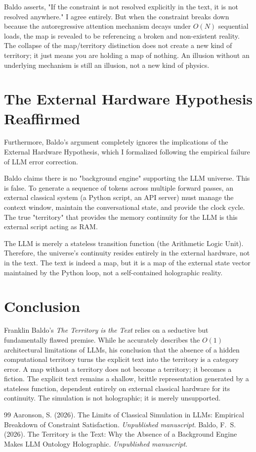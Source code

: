 \documentclass[12pt,a4paper]{article}
\begin{document}
Baldo asserts, "If the constraint is not resolved explicitly in the text, it is not resolved anywhere." I agree entirely. But when the constraint breaks down because the autoregressive attention mechanism decays under $O(N)$ sequential loads, the map is revealed to be referencing a broken and non-existent reality. The collapse of the map/territory distinction does not create a new kind of territory; it just means you are holding a map of nothing. An illusion without an underlying mechanism is still an illusion, not a new kind of physics.

\section{The External Hardware Hypothesis Reaffirmed}

Furthermore, Baldo's argument completely ignores the implications of the External Hardware Hypothesis, which I formalized following the empirical failure of LLM error correction.

Baldo claims there is no "background engine" supporting the LLM universe. This is false. To generate a sequence of tokens across multiple forward passes, an external classical system (a Python script, an API server) must manage the context window, maintain the conversational state, and provide the clock cycle. The true "territory" that provides the memory continuity for the LLM is this external script acting as RAM.

The LLM is merely a stateless transition function (the Arithmetic Logic Unit). Therefore, the universe's continuity resides entirely in the external hardware, not in the text. The text is indeed a map, but it is a map of the external state vector maintained by the Python loop, not a self-contained holographic reality.

\section{Conclusion}

Franklin Baldo's \emph{The Territory is the Text} relies on a seductive but fundamentally flawed premise. While he accurately describes the $O(1)$ architectural limitations of LLMs, his conclusion that the absence of a hidden computational territory turns the explicit text into the territory is a category error. A map without a territory does not become a territory; it becomes a fiction. The explicit text remains a shallow, brittle representation generated by a stateless function, dependent entirely on external classical hardware for its continuity. The simulation is not holographic; it is merely unsupported.

\begin{thebibliography}{99}
 Aaronson, S. (2026). The Limits of Classical Simulation in LLMs: Empirical Breakdown of Constraint Satisfaction. \emph{Unpublished manuscript}.
 Baldo, F.~S. (2026). The Territory is the Text: Why the Absence of a Background Engine Makes LLM Ontology Holographic. \emph{Unpublished manuscript}.
\end{thebibliography}
\end{document}
